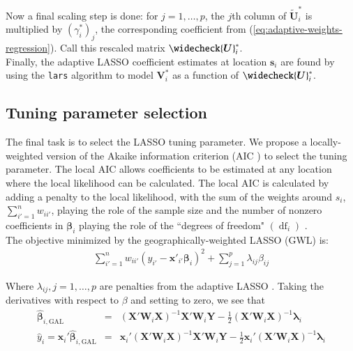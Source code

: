 \documentclass[authoryear, review, 11pt]{elsarticle}
\DeclareMathOperator*{\df}{\mbox{df}}
\begin{document}
	Now a final scaling step is done: for $j=1, \dots, p$, the $j$th column of $\tilde{\bm{U}}_i^*$ is multiplied by $\left(\gamma_i^*\right)_j$, the corresponding coefficient from (\ref{eq:adaptive-weights-regression}). Call this rescaled matrix $\widecheck{\bm{U}}_i^*$.\\
	
	Finally, the adaptive LASSO coefficient estimates at location $\bm{s}_i$ are found by using the \verb!lars! algorithm \citep{Efron:2004b} to model $\bm{V}_i^*$ as a function of $\widecheck{\bm{U}}_i^*$.

	\subsection{Tuning parameter selection}
	The final task is to select the LASSO tuning parameter. We propose a locally-weighted version of the Akaike information criterion (AIC \citep{Akaike:1974}) to select the tuning parameter. The local AIC allows coefficients to be estimated at any location where the local likelihood can be calculated. The local AIC is calculated by adding a penalty to the local likelihood, with the sum of the weights around $s_i$, $\sum_{i'=1}^n w_{ii'}$, playing the role of the sample size and the number of nonzero coefficients in $\bm{\beta}_i$ playing the role of the ``degrees of freedom" $\left( \df_i \right)$ \citep{Zou:2007}.\\
	
	The objective minimized by the geographically-weighted LASSO (GWL) is:	
	\begin{eqnarray}
		\sum_{i'=1}^n w_{ii'} \left(y_{i'} - \bm{x}'_{i'} \bm{\beta}_i \right)^2 + \sum_{j=1}^p \lambda_{ij} \beta_{ij}
	\end{eqnarray}
	
	Where $\lambda_{ij}, j =1, \dots, p$ are penalties from the adaptive LASSO \citep{Zou:2006}. Taking the derivatives with respect to $\beta$ and setting to zero, we see that
	\begin{eqnarray}
		\hat{\bm{\beta}}_{i, \text{GAL}} &=& \left( \bm{X}'\bm{W}_i\bm{X} \right)^{-1}  \bm{X}'\bm{W}_i\bm{Y}  - \frac{1}{2} \left(\bm{X}'\bm{W}_i\bm{X} \right)^{-1} \bm{\lambda}_i\\
		\hat{y}_i = \bm{x}_i' \hat{\bm{\beta}}_{i, \text{GAL}} &=&  \bm{x}_i' \left( \bm{X}'\bm{W}_i\bm{X} \right)^{-1}  \bm{X}'\bm{W}_i\bm{Y}  - \frac{1}{2} \bm{x}_i' \left(\bm{X}'\bm{W}_i\bm{X} \right)^{-1} \bm{\lambda}_i
	\end{eqnarray}
	
\end{document}
